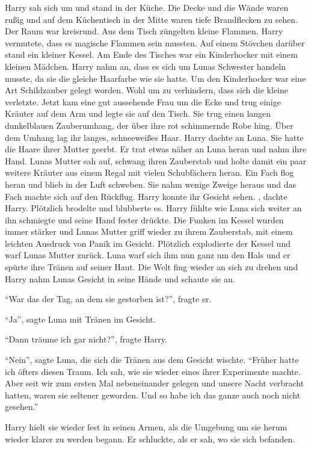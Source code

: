 Harry sah sich um und stand in der Küche. Die Decke und die Wände waren rußig und auf dem Küchentisch in der Mitte waren tiefe Brandflecken zu sehen.  Der Raum war kreisrund. Aus dem Tisch züngelten kleine Flammen. Harry vermutete, dass es magische Flammen sein mussten. Auf einem Stövchen darüber stand ein kleiner Kessel. Am Ende des Tisches war ein Kinderhocker mit einem kleinen Mädchen. Harry nahm an, dass es sich um Lunas Schwester handeln musste, da sie die gleiche Haarfarbe wie sie hatte. Um den Kinderhocker war eine Art Schildzauber gelegt worden. Wohl um zu verhindern, dass sich die kleine verletzte. Jetzt kam eine gut aussehende Frau um die Ecke und trug einige Kräuter auf dem Arm und legte sie auf den Tisch. Sie trug einen langen dunkelblauen Zauberumhang, der über ihre rot schimmernde Robe hing. Über dem Umhang lag ihr langes, schneeweißes Haar. Harry dachte an Luna. Sie hatte die Haare ihrer Mutter geerbt. Er trat etwas näher an Luna heran und nahm ihre Hand. Lunas Mutter sah auf, schwang ihren Zauberstab und holte damit ein paar weitere Kräuter aus einem Regal mit vielen Schubfächern heran. Ein Fach flog heran und blieb in der Luft schweben. Sie nahm wenige Zweige heraus und das Fach machte sich auf den Rückflug. Harry konnte ihr Gesicht sehen. , dachte Harry. Plötzlich brodelte und blubberte es. Harry fühlte wie Luna sich weiter an ihn schmiegte und seine Hand fester drückte. Die Funken im Kessel wurden immer stärker und Lunas Mutter griff wieder zu ihrem Zauberstab, mit einem leichten Ausdruck von Panik im Gesicht. Plötzlich explodierte der Kessel und warf Lunas Mutter zurück. Luna warf sich ihm nun ganz um den Hals und er spürte ihre Tränen auf seiner Haut. Die Welt fing wieder an sich zu drehen und Harry nahm Lunas Gesicht in seine Hände und schaute sie an.

\enquote{War das der Tag, an dem sie gestorben ist?}, fragte er.

\enquote{Ja}, sagte Luna mit Tränen im Gesicht.

\enquote{Dann träume ich gar nicht?}, fragte Harry.

\enquote{Nein}, sagte Luna, die sich die Tränen aus dem Gesicht wischte. \enquote{Früher hatte ich öfters diesen Traum. Ich sah, wie sie wieder eines ihrer Experimente machte. Aber seit wir zum ersten Mal nebeneinander gelegen und unsere Nacht verbracht hatten, waren sie seltener geworden. Und so habe ich das ganze auch noch nicht gesehen.}

Harry hielt sie wieder fest in seinen Armen, als die Umgebung um sie herum wieder klarer zu werden begann. Er schluckte, als er sah, wo sie sich befanden.

